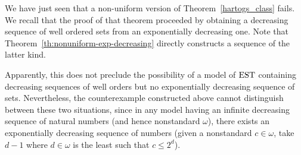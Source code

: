 We have just seen that a non-uniform version of Theorem~\ref{hartogs_class}
fails. We recall that the proof of that theorem proceeded by obtaining a decreasing sequence of
well ordered sets from an exponentially decreasing one. Note that
Theorem~\ref{th:nonuniform-exp-decreasing} directly constructs a sequence
of the latter kind.

Apparently, this does not preclude the possibility of a model of
$\mathrm{EST}$ containing decreasing sequences of well orders but no exponentially
decreasing sequence of sets. Nevertheless, the counterexample constructed above
cannot distinguish between these two situations, since in any model having
an infinite decreasing sequence of natural numbers (and hence nonstandard
$\omega$), there exists an exponentially decreasing sequence of numbers
(given a nonstandard $c\in\omega$, take $d-1$ where $d\in\omega$ is the least
such that $c\leq 2^d$).  


